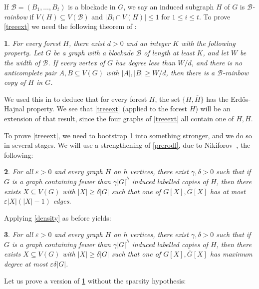 \documentclass[titlepage,11pt]{article}
\def\ll{,\ldots,}
\newcommand{\vare}{\varepsilon}
\newtheorem{thm}{}[section]
\begin{document}
If $\mathcal{B}=(B_1\ll B_t)$ is a blockade in $G$, we say an induced subgraph $H$ of $G$ is {\em $\mathcal{B}$-rainbow} if $V(H)\subseteq V(\mathcal{B})$ and
$|B_i \cap V(H)|\le 1$ for $1\le i\le t$.
To prove \ref{treeext} we need the following theorem of \cite{pure1}:

\begin{thm}\label{pure1}
For every forest $H$, there exist $d>0$ and an integer $K$ with the following property. Let $G$ be a graph 
with a blockade $\mathcal{B}$ of length at least $K$, and let $W$ be the width of $\mathcal{B}$. If 
every vertex of $G$ has degree less than $W/d$, and
there is no anticomplete pair $A,B\subseteq V(G)$ with $|A|,|B|\ge W/d$,
then
there is a $\mathcal{B}$-rainbow copy of $H$ in $G$.
\end{thm}

We used this in \cite{pure1} to deduce that for every forest $H$, the set $\{H,\overline{H}\}$ has the Erd\H os-Hajnal property.
We see that \ref{treeext} (applied to the forest $H$) will be an
extension of that result, since the four graphs of \ref{treeext} all contain one of $H, \overline{H}$.

To prove \ref{treeext}, we need to bootstrap \ref{pure1} into something stronger, and we do so in several stages. 
We will use a strengthening of \ref{prerodl}, 
due to Nikiforov~\cite{nikiforov}, the following:

\begin{thm}\label{prefoxrodl}
For all $\vare>0$ and every graph $H$ on $h$ vertices, there exist $\gamma, \delta>0$ such that
if $G$ is a graph containing
fewer than $\gamma|G|^h$ induced labelled copies of $H$, then there exists $X\subseteq V(G)$ with $|X|\ge \delta|G|$
such that one of $G[X], \overline{G}[X]$ has at most $\vare|X|(|X|-1)$ edges.
\end{thm}

Applying \ref{density} as before yields:

\begin{thm}\label{foxrodl}
For all $\vare>0$ and every graph $H$ on $h$ vertices, there exist $\gamma, \delta>0$ such that
if $G$ is a graph containing
fewer than $\gamma|G|^h$ induced labelled copies of $H$, then there exists $X\subseteq V(G)$ with $|X|\ge \delta|G|$
such that one of $G[X], \overline{G}[X]$ has maximum degree at most $\vare\delta|G|$.
\end{thm}

Let us prove a version of \ref{pure1} without the sparsity hypothesis:
\end{document}
